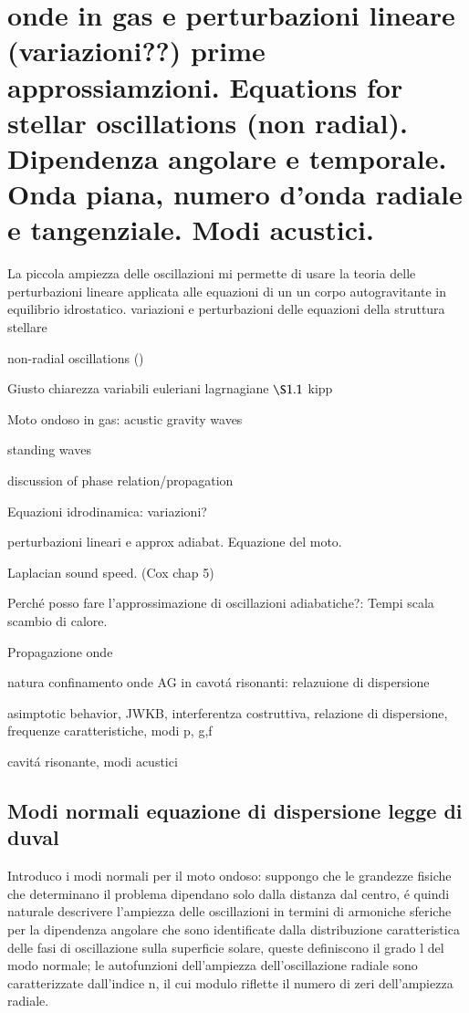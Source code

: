 \documentclass[oneside,12pt,fleqn]{memoir}
\begin{document}
\printbibliography[heading=subbibintoc]


\section{onde in gas e perturbazioni lineare (variazioni??) prime approssiamzioni. Equations for stellar oscillations (non radial). Dipendenza angolare e temporale. Onda piana, numero d'onda radiale e tangenziale. Modi acustici.}

La piccola ampiezza delle oscillazioni mi permette di usare la teoria delle perturbazioni lineare applicata alle equazioni di un un corpo autogravitante in equilibrio idrostatico. variazioni e perturbazioni delle equazioni della struttura stellare

\begin{itemize*}
\item non-radial oscillations  (\cite{han12stellar})
\item Giusto chiarezza variabili euleriani lagrnagiane $\S 1.1$ kipp

\item Moto ondoso in gas: acustic gravity waves
\item standing waves
\item discussion of phase relation/propagation
\item Equazioni idrodinamica: variazioni?
\item perturbazioni lineari e approx adiabat. Equazione del moto.
\item Laplacian sound speed. (Cox chap 5)
\item Perch\'e posso fare l'approssimazione di oscillazioni adiabatiche?: Tempi scala scambio di calore.
\item Propagazione onde \cite{tol63waves}
\item natura confinamento onde AG in cavot\'a risonanti: relazuione di dispersione

\item asimptotic behavior, JWKB, interferentza costruttiva, relazione di dispersione, frequenze caratteristiche, modi p, g,f
\item cavit\'a risonante, modi acustici
\end{itemize*}


\subsection{Modi normali equazione di dispersione legge di duval}
Introduco i modi normali per il moto ondoso: suppongo che le grandezze fisiche che determinano il problema dipendano solo dalla distanza dal centro, \'e quindi naturale descrivere l'ampiezza delle oscillazioni  in termini di armoniche sferiche per la dipendenza angolare che sono identificate dalla distribuzione caratteristica delle fasi di oscillazione sulla superficie solare, queste definiscono il grado l del modo normale; le autofunzioni dell'ampiezza dell'oscillazione radiale sono caratterizzate dall'indice n, il cui modulo riflette il numero di zeri dell'ampiezza radiale.
\end{document}

